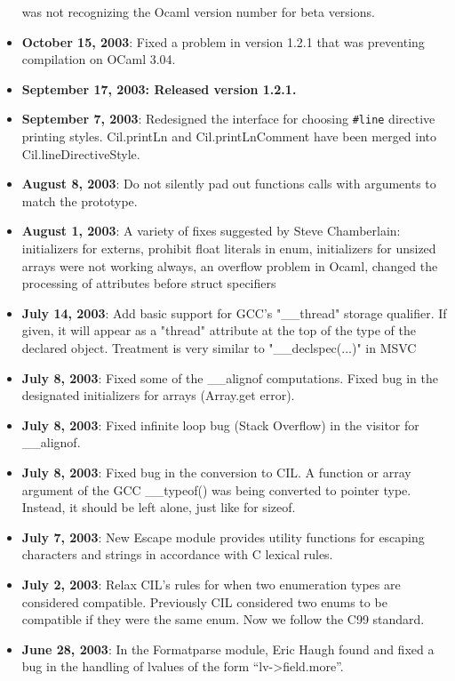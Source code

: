 \documentclass{article}
\begin{document}
\begin{itemize}
  was not recognizing the Ocaml version number for beta versions. 
\item {\bf October 15, 2003}: Fixed a problem in version 1.2.1 that was
  preventing compilation on OCaml 3.04.
\item {\bf September 17, 2003: Released version 1.2.1.}
\item {\bf September 7, 2003}: Redesigned the interface for choosing
  \texttt{\#line} directive printing styles.  Cil.printLn and
  Cil.printLnComment have been merged into Cil.lineDirectiveStyle.
\item {\bf August 8, 2003}: Do not silently pad out functions calls with
arguments to match the prototype. 
\item {\bf August 1, 2003}: A variety of fixes suggested by Steve Chamberlain:
initializers for externs, prohibit float literals in enum, initializers for
unsized arrays were not working always, an overflow problem in Ocaml, changed
the processing of attributes before struct specifiers

\item {\bf July 14, 2003}: Add basic support for GCC's "\_\_thread" storage
qualifier. If given, it will appear as a "thread" attribute at the top of the
type of the declared object. Treatment is very similar to "\_\_declspec(...)"
in MSVC

\item {\bf July 8, 2003}: Fixed some of the \_\_alignof computations. Fixed
  bug in the designated initializers for arrays (Array.get error).
\item {\bf July 8, 2003}: Fixed infinite loop bug (Stack Overflow) in the
  visitor for \_\_alignof.
\item {\bf July 8, 2003}: Fixed bug in the conversion to CIL. A function or
  array argument of
  the GCC \_\_typeof() was being converted to pointer type. Instead, it should
  be left alone, just like for sizeof.  
\item {\bf July 7, 2003}: New Escape module provides utility functions
  for escaping characters and strings in accordance with C lexical
  rules.

\item {\bf July 2, 2003}: Relax CIL's rules for when two enumeration types are
considered compatible. Previously CIL considered two enums to be compatible if
they were the same enum. Now we follow the C99 standard.


\item {\bf June 28, 2003}: In the Formatparse module, Eric Haugh found and
  fixed a bug in the handling of lvalues of the form ``lv->field.more''.


\end{itemize}
\end{document}
